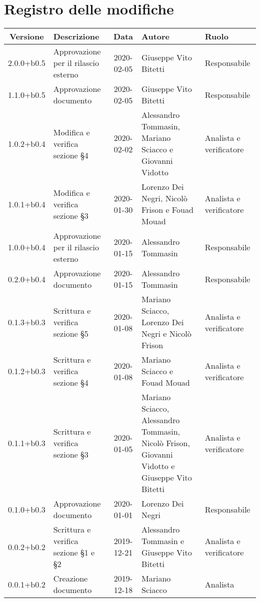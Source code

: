 \section*{Registro delle modifiche}

\begin{center}
	\begin{longtable}{|c|p{3cm}|c|p{4cm}|p{2cm}|}
	\hline
	\rowcolor{lighter-grayer}
	\textbf{Versione} & \textbf{Descrizione} & \textbf{Data} & \textbf{Autore} & \textbf{Ruolo} \\
	\hline
	\endfirsthead


	2.0.0+b0.5 & Approvazione per il rilascio esterno & 2020-02-05 & Giuseppe Vito Bitetti & Responsabile \\
	\hline
	1.1.0+b0.5 & Approvazione documento & 2020-02-05 & Giuseppe Vito Bitetti & Responsabile \\
	\hline
	1.0.2+b0.4 & Modifica e verifica sezione \S4 & 2020-02-02 & Alessandro Tommasin, Mariano Sciacco e Giovanni Vidotto & Analista e verificatore \\
	\hline
	1.0.1+b0.4 & Modifica e verifica sezione \S3 & 2020-01-30 & Lorenzo Dei Negri, Nicolò Frison e Fouad Mouad & Analista e verificatore \\
	\hline
	1.0.0+b0.4 & Approvazione per il rilascio esterno & 2020-01-15 & Alessandro Tommasin & Responsabile \\
	\hline
	0.2.0+b0.4 & Approvazione documento & 2020-01-15 & Alessandro Tommasin & Responsabile \\
	\hline
	0.1.3+b0.3 & Scrittura e verifica sezione \S5 & 2020-01-08 & Mariano Sciacco, Lorenzo Dei Negri e Nicolò Frison & Analista e verificatore \\
	\hline
	0.1.2+b0.3 & Scrittura e verifica sezione \S4 & 2020-01-08 & Mariano Sciacco e Fouad Mouad & Analista e verificatore \\
	\hline
	0.1.1+b0.3 & Scrittura e verifica sezione \S3 & 2020-01-05 & Mariano Sciacco, Alessandro Tommasin, Nicolò Frison, Giovanni Vidotto e Giuseppe Vito Bitetti & Analista e verificatore \\
	\hline
	0.1.0+b0.3 & Approvazione documento & 2020-01-01 & Lorenzo Dei Negri & Responsabile \\
	\hline
	0.0.2+b0.2 & Scrittura e verifica sezione \S1 e \S2 & 2019-12-21 & Alessandro Tommasin e Giuseppe Vito Bitetti & Analista e verificatore \\
	\hline
	0.0.1+b0.2 & Creazione documento & 2019-12-18 & Mariano Sciacco & Analista \\
	\hline

	\end{longtable}
\end{center}
